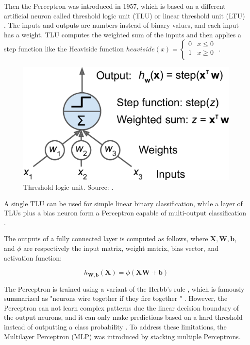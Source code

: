 \documentclass[a4paper, 11pt, oneside]{article}
\begin{document}
  Then the Perceptron was introduced in 1957, which is based on a different artificial neuron called threshold logic unit
  (TLU) or linear threshold unit (LTU) \cite{rosenblatt1957perceptron}. The inputs and outputs are numbers instead of
  binary values, and each input has a weight. TLU computes the weighted sum of the inputs and then applies a step
  function like the Heaviside function
  $heaviside (x) =
  \begin{cases}
    0 & x \le 0 \\
    1 & x \geq 0 \\
  \end{cases}$
  \cite{geron2019hands, rosenblatt1957perceptron}.

  \begin{figure}[ht]
    \begin{center}
      \includegraphics[width=.8\textwidth]{tlu.png}
    \end{center}
    \caption{Threshold logic unit. Source: \cite{geron2019hands}.}
  \end{figure}

  A single TLU can be used for simple linear binary classification, while a layer of TLUs plus a bias neuron form a
  Perceptron capable of multi-output classification \cite{geron2019hands}.

  The outputs of a fully connected layer is computed as follows, where $\mathbf{X}, \mathbf{W}, \mathbf{b}$, and $\phi$
  are respectively the input matrix, weight matrix, bias vector, and activation function:

  $$h_{\mathbf{W,b}}(\mathbf{X}) = \phi(\mathbf{XW} + \mathbf{b})$$

  The Perceptron is trained using a variant of the Herbb's rule \cite{hebb2005organization}, which is famously summarized
  as "neurons wire together if they fire together \cite{lowel1992selection}" \cite{geron2019hands}. However, the Perceptron
  can not learn complex patterns due the linear decision boundary of the output neurons, and it can only make predictions
  based on a hard threshold instead of outputting a class probability \cite{geron2019hands}. To address these limitations,
  the Multilayer Perceptron (MLP) was introduced by stacking multiple Perceptrons.
\end{document}
